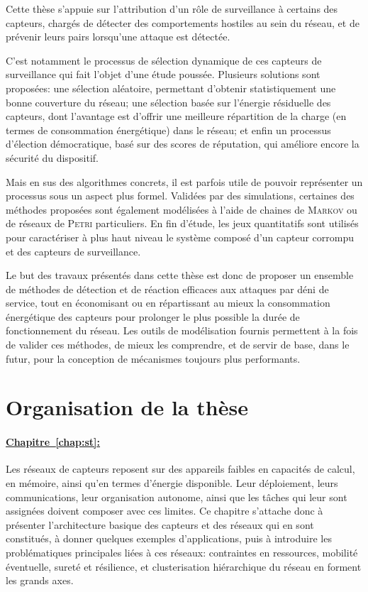 Cette thèse s'appuie sur l'attribution d'un rôle de surveillance à certains des capteurs, chargés de détecter des comportements hostiles au sein du réseau, et de prévenir leurs pairs lorsqu'une attaque est détectée.

C'est notamment le processus de sélection dynamique de ces capteurs de surveillance qui fait l'objet d'une étude poussée.
Plusieurs solutions sont proposées: une sélection aléatoire, permettant d'obtenir statistiquement une bonne couverture du réseau; une sélection basée sur l'énergie résiduelle des capteurs, dont l'avantage est d'offrir une meilleure répartition de la charge (en termes de consommation énergétique) dans le réseau; et enfin un processus d'élection démocratique, basé sur des scores de réputation, qui améliore encore la sécurité du dispositif.

Mais en sus des algorithmes concrets, il est parfois utile de pouvoir représenter un processus sous un aspect plus formel.
Validées par des simulations, certaines des méthodes proposées sont également modélisées à l'aide de chaines de \textsc{Markov} ou de réseaux de \textsc{Petri} particuliers.
En fin d'étude, les jeux quantitatifs sont utilisés pour caractériser à plus haut niveau le système composé d'un capteur corrompu et des capteurs de surveillance.
\pagebreak %

Le but des travaux présentés dans cette thèse est donc de proposer un ensemble de méthodes de détection et de réaction efficaces aux attaques par déni de service, tout en économisant ou en répartissant au mieux la consommation énergétique des capteurs pour prolonger le plus possible la durée de fonctionnement du réseau.
Les outils de modélisation fournis permettent à la fois de valider ces méthodes, de mieux les comprendre, et de servir de base, dans le futur, pour la conception de mécanismes toujours plus performants.

\section{Organisation de la thèse}

\newcommand\chappar[1]{%
    \paragraph{\hyperref[chap:#1]{%
        Chapitre~\ref*{chap:#1}: \nameref*{chap:#1}%
}}}

\chappar{st}
Les réseaux de capteurs reposent sur des appareils faibles en capacités de calcul, en mémoire, ainsi qu'en termes d'énergie disponible.
Leur déploiement, leurs communications, leur organisation autonome, ainsi que les tâches qui leur sont assignées doivent composer avec ces limites.
Ce chapitre s'attache donc à présenter l'architecture basique des capteurs et des réseaux qui en sont constitués, à donner quelques exemples d'applications, puis à introduire les problématiques principales liées à ces réseaux: contraintes en ressources, mobilité éventuelle, sureté et résilience, et clusterisation hiérarchique du réseau en forment les grands axes.

